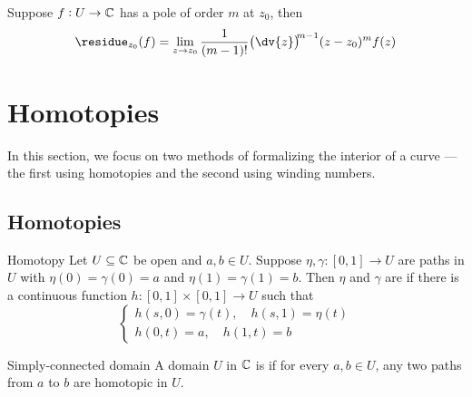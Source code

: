 \documentclass{styles/tufte}
\begin{document}
  \begin{lemma}{}{}
    Suppose $f: U \to \mathbb{C}$ has a pole of order $m$ at $z_0$, then
    \[ \residue_{z_0}(f) = \lim_{z \to z_0} \frac{1}{(m - 1)!} \left(\dv{z}\right)^{\hspace{-0.25em}m-1} (z - z_0)^m f(z) \]
  \end{lemma}




\section{Homotopies}

In this section, we focus on two methods of formalizing the interior of a curve --- the first using homotopies and the second using winding numbers.

\subsection{Homotopies}

  \begin{definition}{Homotopy}{}
    Let $U \subseteq \mathbb{C}$ be open and $a, b \in U$. Suppose $\eta, \gamma: [0, 1] \to U$ are paths in $U$ with $\eta(0) = \gamma(0) = a$ and $\eta(1) = \gamma(1) = b$. Then $\eta$ and $\gamma$ are  if there is a continuous function $h: [0, 1] \times [0, 1] \to U$ such that
    \[ \begin{cases}
      h(s, 0) = \gamma(t), \quad h(s, 1) = \eta(t) \\
      h(0, t) = a, \quad h(1, t) = b
    \end{cases} \]
  \end{definition}
  
  \begin{definition}{Simply-connected domain}{}
    A domain $U$ in $\mathbb{C}$ is  if for every $a, b \in U$, any two paths from $a$ to $b$ are homotopic in $U$.
  \end{definition}
  
\end{document}
